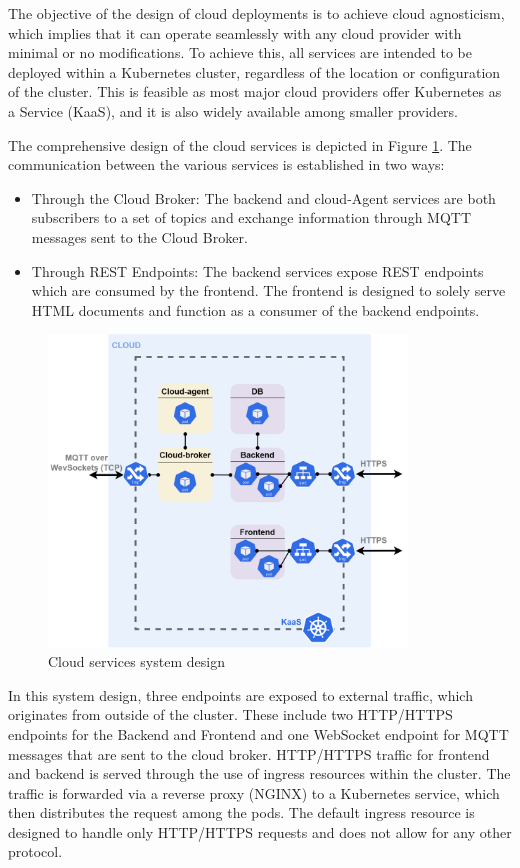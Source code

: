 The objective of the design of cloud deployments is to achieve cloud agnosticism, which implies that it can operate seamlessly with any cloud provider with minimal or no modifications. To achieve this, all services are intended to be deployed within a Kubernetes cluster, regardless of the location or configuration of the cluster. This is feasible as most major cloud providers offer Kubernetes as a Service (KaaS), and it is also widely available among smaller providers.

The comprehensive design of the cloud services is depicted in Figure \ref{fig:cloud_services}. The communication between the various services is established in two ways:
\begin{itemize}
    \item Through the Cloud Broker: The backend and cloud-Agent services are both subscribers to a set of topics and exchange information through MQTT messages sent to the Cloud Broker.
    \item Through REST Endpoints: The backend services expose REST endpoints which are consumed by the frontend. The frontend is designed to solely serve HTML documents and function as a consumer of the backend endpoints.
\end{itemize}

\begin{figure}[H]
    \centering
    \includegraphics[width=0.85\textwidth]{pictures/cloud_services.png}
    \caption{Cloud services system design}
    \label{fig:cloud_services}
\end{figure}

In this system design, three endpoints are exposed to external traffic, which originates from outside of the cluster. These include two HTTP/HTTPS endpoints for the Backend and Frontend and one WebSocket endpoint for MQTT messages that are sent to the cloud broker. HTTP/HTTPS traffic for frontend and backend is served through the use of ingress resources within the cluster. The traffic is forwarded via a reverse proxy (NGINX) to a Kubernetes service, which then distributes the request among the pods. The default ingress resource is designed to handle only HTTP/HTTPS requests and does not allow for any other protocol.

